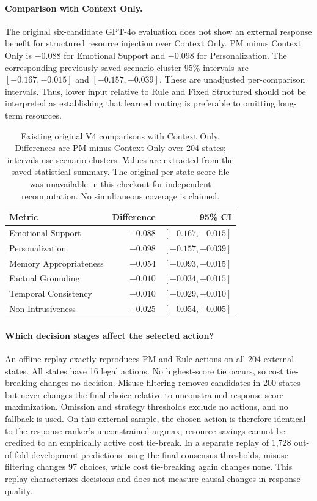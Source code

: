 \paragraph{Comparison with Context Only.}
The original six-candidate GPT-4o evaluation does not show an external
response benefit for structured resource injection over Context Only.
PM minus Context Only is $-0.088$ for Emotional Support and $-0.098$ for
Personalization. The corresponding previously saved scenario-cluster
95\% intervals are $[-0.167,-0.015]$ and $[-0.157,-0.039]$.
These are unadjusted per-comparison intervals. Thus, lower input relative
to Rule and Fixed Structured should not be interpreted as establishing
that learned routing is preferable to omitting long-term resources.

\begin{table}[t]
\centering
\small
\caption{Existing original V4 comparisons with Context Only. Differences
are PM minus Context Only over 204 states; intervals use scenario clusters.
Values are extracted from the saved statistical summary. The original
per-state score file was unavailable in this checkout for independent
recomputation. No simultaneous coverage is claimed.}
\label{tab:context_only_supplement}
\begin{tabular}{lrr}
\toprule
Metric & Difference & 95\% CI \\
\midrule
Emotional Support & $-0.088$ & $[-0.167,-0.015]$ \\
Personalization & $-0.098$ & $[-0.157,-0.039]$ \\
Memory Appropriateness & $-0.054$ & $[-0.093,-0.015]$ \\
Factual Grounding & $-0.010$ & $[-0.034,+0.015]$ \\
Temporal Consistency & $-0.010$ & $[-0.029,+0.010]$ \\
Non-Intrusiveness & $-0.025$ & $[-0.054,+0.005]$ \\
\bottomrule
\end{tabular}
\end{table}

\paragraph{Which decision stages affect the selected action?}
An offline replay exactly reproduces PM and Rule actions on all 204 external
states. All states have 16 legal actions. No highest-score tie occurs, so
cost tie-breaking changes no decision. Misuse filtering removes candidates
in 200 states but never changes the final choice relative to unconstrained
response-score maximization. Omission and strategy thresholds exclude no
actions, and no fallback is used. On this external sample, the chosen action
is therefore identical to the response ranker's unconstrained argmax;
resource savings cannot be credited to an empirically active cost tie-break.
In a separate replay of 1,728 out-of-fold development predictions using the
final consensus thresholds, misuse filtering changes 97 choices, while
cost tie-breaking again changes none. This replay characterizes decisions
and does not measure causal changes in response quality.

